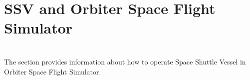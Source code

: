 \documentclass[Space_Shuttle_Vessel_Manual.tex]{subfiles}
\begin{document}
\section{SSV and Orbiter Space Flight Simulator}
\begin{multicols*}{2}
\renewcommand{\cfttoctitlefont}{\bf}
\localtableofcontents
\noindent
\\
The section provides information about how to operate Space Shuttle Vessel in Orbiter Space Flight Simulator.

\end{multicols*}


\newpage
\end{document}
